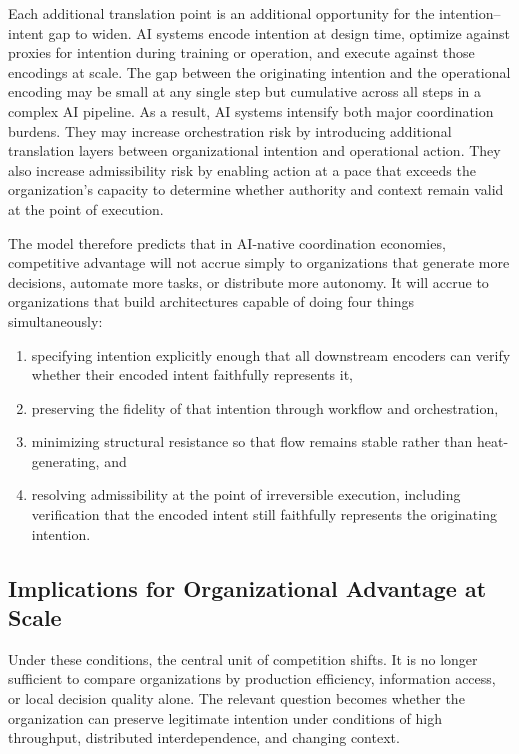 \documentclass[12pt]{article}
\begin{document}
Each additional translation point is an additional opportunity for the
intention--intent gap to widen. AI systems encode intention at design time,
optimize against proxies for intention during training or operation, and
execute against those encodings at scale. The gap between the originating
intention and the operational encoding may be small at any single step but
cumulative across all steps in a complex AI pipeline. As a result, AI systems
intensify both major coordination burdens. They may increase orchestration
risk by introducing additional translation layers between organizational
intention and operational action. They also increase admissibility risk by
enabling action at a pace that exceeds the organization's capacity to determine
whether authority and context remain valid at the point of execution.

The model therefore predicts that in AI-native coordination economies,
competitive advantage will not accrue simply to organizations that generate
more decisions, automate more tasks, or distribute more autonomy. It will
accrue to organizations that build architectures capable of doing four things
simultaneously:

\begin{enumerate}
  \item specifying intention explicitly enough that all downstream encoders
    can verify whether their encoded intent faithfully represents it,
  \item preserving the fidelity of that intention through workflow and
    orchestration,
  \item minimizing structural resistance so that flow remains stable rather
    than heat-generating, and
  \item resolving admissibility at the point of irreversible execution,
    including verification that the encoded intent still faithfully
    represents the originating intention.
\end{enumerate}

\subsection{Implications for Organizational Advantage at Scale}

Under these conditions, the central unit of competition shifts. It is no
longer sufficient to compare organizations by production efficiency,
information access, or local decision quality alone. The relevant question
becomes whether the organization can preserve legitimate intention under
conditions of high throughput, distributed interdependence, and changing
context.
\end{document}
